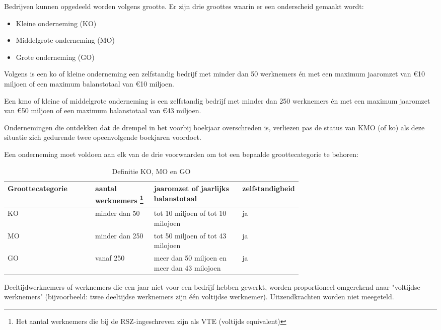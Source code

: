 Bedrijven kunnen opgedeeld worden volgens grootte. Er zijn drie groottes waarin er een onderscheid gemaakt wordt:

\begin{itemize}
    \item Kleine onderneming (KO)
    \item Middelgrote onderneming (MO)
    \item Grote onderneming (GO)
\end{itemize}

Volgens \textcite{Vlaio2014} is een ko of kleine onderneming een zelfstandig bedrijf met minder dan 50 werknemers én met een maximum jaaromzet van €10 miljoen of een maximum balanstotaal van €10 miljoen.

Een kmo of kleine of middelgrote onderneming is een zelfstandig bedrijf met minder dan 250 werknemers én met een maximum jaaromzet van €50 miljoen of een maximum balanstotaal van €43 miljoen.

Ondernemingen die ontdekken dat de drempel in het voorbij boekjaar overschreden is, verliezen pas de status van KMO (of ko) als deze situatie zich gedurende twee opeenvolgende boekjaren voordoet.

\newpage
Een onderneming moet voldoen aan elk van de drie voorwaarden om tot een bepaalde groottecategorie te behoren:

\begin{table}[ht]
    \centering
    \caption{Definitie KO, MO en GO}
    \begin{tabular}[t]{l>{\raggedright}p{0.2\linewidth}>{\raggedright\arraybackslash}p{0.3\linewidth}>{\raggedright\arraybackslash}p{0.18\linewidth}}
        \toprule
        \textbf{Groottecategorie} & \textbf{aantal werknemers \footnote{ Het aantal werknemers die bij de RSZ-ingeschreven zijn als VTE (voltijds equivalent)} } & \textbf{jaaromzet of jaarlijks balanstotaal} & \textbf{zelfstandigheid} \\
        \midrule
        KO & minder dan 50 & tot 10 miljoen of tot 10 milojoen & ja \\
        MO  &minder dan 250 & tot 50 miljoen of tot 43 milojoen & ja \\
        GO & vanaf 250 & meer dan 50 miljoen en meer dan 43 milojoen & ja \\
        \bottomrule
    \end{tabular}
\end{table}


Deeltijdwerknemers of werknemers die een jaar niet voor een bedrijf hebben gewerkt, worden proportioneel omgerekend naar "voltijdse werknemers" (bijvoorbeeld: twee deeltijdse werknemers zijn één voltijdse werknemer). Uitzendkrachten worden niet meegeteld.

